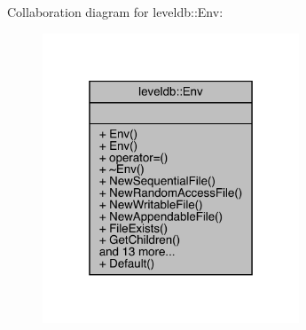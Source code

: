Collaboration diagram for leveldb\+::Env\+:
\nopagebreak
\begin{figure}[H]
\begin{center}
\leavevmode
\includegraphics[width=217pt]{classleveldb_1_1_env__coll__graph}
\end{center}
\end{figure}
